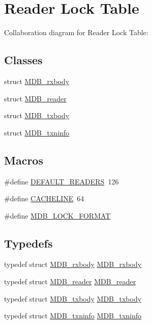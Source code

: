 \hypertarget{group__readers}{}\section{Reader Lock Table}
\label{group__readers}
Collaboration diagram for Reader Lock Table\+:
\subsection*{Classes}
\begin{DoxyCompactItemize}
\item 
struct \mbox{\hyperlink{struct_m_d_b__rxbody}{M\+D\+B\+\_\+rxbody}}
\item 
struct \mbox{\hyperlink{struct_m_d_b__reader}{M\+D\+B\+\_\+reader}}
\item 
struct \mbox{\hyperlink{struct_m_d_b__txbody}{M\+D\+B\+\_\+txbody}}
\item 
struct \mbox{\hyperlink{struct_m_d_b__txninfo}{M\+D\+B\+\_\+txninfo}}
\end{DoxyCompactItemize}
\subsection*{Macros}
\begin{DoxyCompactItemize}
\item 
\#define \mbox{\hyperlink{group__readers_gadff1f7b4d4626610a8d616e0c6dbbea4}{D\+E\+F\+A\+U\+L\+T\+\_\+\+R\+E\+A\+D\+E\+RS}}~126
\item 
\#define \mbox{\hyperlink{group__readers_gaa62717a1fae2c57f94f2a9b8ae08ec49}{C\+A\+C\+H\+E\+L\+I\+NE}}~64
\item 
\#define \mbox{\hyperlink{group__readers_gabb6423d38a9132eedb4f2e2be72b8aeb}{M\+D\+B\+\_\+\+L\+O\+C\+K\+\_\+\+F\+O\+R\+M\+AT}}
\end{DoxyCompactItemize}
\subsection*{Typedefs}
\begin{DoxyCompactItemize}
\item 
typedef struct \mbox{\hyperlink{struct_m_d_b__rxbody}{M\+D\+B\+\_\+rxbody}} \mbox{\hyperlink{group__readers_ga441ab38871fdc5337aa8d65774c0836d}{M\+D\+B\+\_\+rxbody}}
\item 
typedef struct \mbox{\hyperlink{struct_m_d_b__reader}{M\+D\+B\+\_\+reader}} \mbox{\hyperlink{group__readers_gad3ac1f5bf85920df3818e91fe9031493}{M\+D\+B\+\_\+reader}}
\item 
typedef struct \mbox{\hyperlink{struct_m_d_b__txbody}{M\+D\+B\+\_\+txbody}} \mbox{\hyperlink{group__readers_ga190cd27d9867f4ec4f26c33ff63cac59}{M\+D\+B\+\_\+txbody}}
\item 
typedef struct \mbox{\hyperlink{struct_m_d_b__txninfo}{M\+D\+B\+\_\+txninfo}} \mbox{\hyperlink{group__readers_ga32aadb60ce01bc428cc35a76ed6ed3d6}{M\+D\+B\+\_\+txninfo}}
\end{DoxyCompactItemize}


